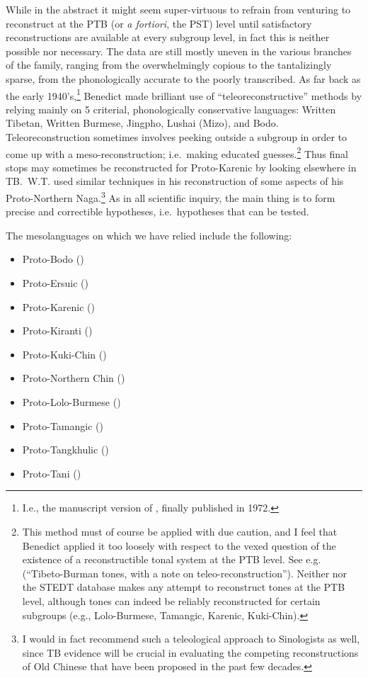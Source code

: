 While in the abstract it might seem super-virtuous to refrain from venturing to reconstruct at the PTB (or {\it a fortiori}, the PST) level until satisfactory reconstructions are available at every subgroup level, in fact this is neither possible nor necessary. The data are still mostly uneven in the various branches of the family, ranging from the overwhelmingly copious to the tantalizingly sparse, from the phonologically accurate to the poorly transcribed. As far back as the early 1940’s,\footnote{I.e., the manuscript version of \textit{}, finally published in 1972.} Benedict made brilliant use of “teleoreconstructive” methods by relying mainly on 5 criterial, phonologically conservative languages: Written Tibetan, Written Burmese, Jingpho, Lushai (Mizo), and Bodo. Teleoreconstruction sometimes involves peeking outside a subgroup in order to come up with a meso-reconstruction; i.e.\ making educated guesses.\footnote{This method must of course be applied with due caution, and I feel that Benedict applied it too loosely with respect to the vexed question of the existence of a reconstructible tonal system at the PTB level. See e.g.\ \citealt{PKB-TBT} (“Tibeto-Burman tones, with a note on teleo-reconstruction”). Neither \textit{} nor the STEDT database makes any attempt to reconstruct tones at the PTB level, although tones can indeed be reliably reconstructed for certain subgroups (e.g., Lolo-Burmese, Tamangic, Karenic, Kuki-Chin).} Thus final stops may sometimes be reconstructed for Proto-Karenic by looking elsewhere in TB.\ W.T. \citet{WTF-PNN} used similar techniques in his reconstruction of some aspects of his Proto-Northern Naga.\footnote{I would in fact recommend such a teleological approach to Sinologists as well, since TB evidence will be crucial in evaluating the competing reconstructions of Old Chinese that have been proposed in the past few decades.} As in all scientific inquiry, the main thing is to form precise and correctible hypotheses, i.e.\ hypotheses that can be tested.

The mesolanguages on which we have relied include the following:

\begin{itemize}

\item Proto-Bodo (\citealt{RB-PB})
\item Proto-Ersuic (\citealt{DY-PE})
\item Proto-Karenic (\citealt{H-RKC,H-STK,RBJ-KLS,RB-PKR,TL-PK,Solnitinprep,Shintaniinprep})
\item Proto-Kiranti (\citealt{BM-PK7})
\item Proto-Kuki-Chin (\citealt{KVB-PKC})
\item Proto-Northern Chin (\citealt{CB-PNC})
\item Proto-Lolo-Burmese (\citealt{RB-PLB,JAM-LPLB,JAM-TSR,JAM-TJLB,JAM-MLBM,JAM-Quo,JAM-LDTB,JAM-PLBA,DB-PLolo})
\item Proto-Tamangic (\citealt{MM-K78,MM-Thesis})
\item Proto-Tangkhulic (\citealt{DRM-Tk})
\item Proto-Tani (\citealt{JS-HCST})

\end{itemize}

